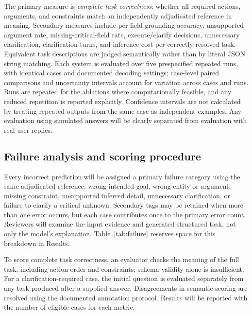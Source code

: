 \documentclass[10pt,conference]{IEEEtran}
\begin{document}
The primary measure is \emph{complete task correctness}: whether all required actions, arguments, and constraints match an independently adjudicated reference in meaning. Secondary measures include per-field grounding accuracy, unsupported-argument rate, missing-critical-field rate, execute/clarify decisions, unnecessary clarification, clarification turns, and inference cost per correctly resolved task. Equivalent task descriptions are judged semantically rather than by literal JSON string matching. Each system is evaluated over five prespecified repeated runs, with identical cases and documented decoding settings; case-level paired comparisons and uncertainty intervals account for variation across cases and runs. Runs are repeated for the ablations where computationally feasible, and any reduced repetition is reported explicitly. Confidence intervals are not calculated by treating repeated outputs from the same case as independent examples. Any evaluation using simulated answers will be clearly separated from evaluation with real user replies.

\subsection{Failure analysis and scoring procedure}
Every incorrect prediction will be assigned a primary failure category using the same adjudicated reference: wrong intended goal, wrong entity or argument, missing constraint, unsupported inferred detail, unnecessary clarification, or failure to clarify a critical unknown. Secondary tags may be retained when more than one error occurs, but each case contributes once to the primary error count. Reviewers will examine the input evidence and generated structured task, not only the model's explanation. Table~\ref{tab:failure} reserves space for this breakdown in Results.

To score complete task correctness, an evaluator checks the meaning of the full task, including action order and constraints; schema validity alone is insufficient. For a clarification-required case, the initial question is evaluated separately from any task produced after a supplied answer. Disagreements in semantic scoring are resolved using the documented annotation protocol. Results will be reported with the number of eligible cases for each metric.
\end{document}
